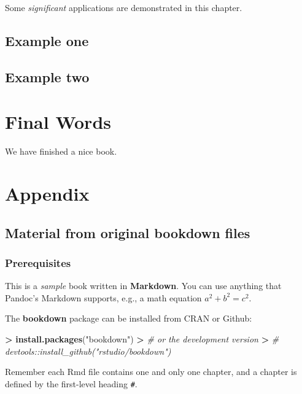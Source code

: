 \documentclass[]{book}
\newenvironment{Shaded}{\begin{snugshade}}{\end{snugshade}}
\newcommand{\KeywordTok}[1]{\textcolor[rgb]{0.13,0.29,0.53}{\textbf{#1}}}
\newcommand{\StringTok}[1]{\textcolor[rgb]{0.31,0.60,0.02}{#1}}
\newcommand{\CommentTok}[1]{\textcolor[rgb]{0.56,0.35,0.01}{\textit{#1}}}
\newcommand{\OperatorTok}[1]{\textcolor[rgb]{0.81,0.36,0.00}{\textbf{#1}}}
\newcommand{\ErrorTok}[1]{\textcolor[rgb]{0.64,0.00,0.00}{\textbf{#1}}}
\newcommand{\NormalTok}[1]{#1}
\theoremstyle{definition}
\theoremstyle{definition}
\theoremstyle{definition}
\theoremstyle{remark}
\begin{document}
Some \emph{significant} applications are demonstrated in this chapter.

\section{Example one}\label{example-one}

\section{Example two}\label{example-two}

\chapter{Final Words}\label{final-words}

We have finished a nice book.

\chapter{Appendix}\label{appendix}

\section{Material from original bookdown
files}\label{material-from-original-bookdown-files}

\subsection{Prerequisites}\label{prerequisites}

This is a \emph{sample} book written in \textbf{Markdown}. You can use
anything that Pandoc's Markdown supports, e.g., a math equation
\(a^2 + b^2 = c^2\).

The \textbf{bookdown} package can be installed from CRAN or Github:

\begin{Shaded}
\begin{Highlighting}[]
\OperatorTok{>}\StringTok{ }\KeywordTok{install.packages}\NormalTok{(}\StringTok{"bookdown"}\NormalTok{)}
\OperatorTok{>}\StringTok{ }\CommentTok{# or the development version}
\ErrorTok{>}\StringTok{ }\CommentTok{# devtools::install_github("rstudio/bookdown")}
\end{Highlighting}
\end{Shaded}

Remember each Rmd file contains one and only one chapter, and a chapter
is defined by the first-level heading \texttt{\#}.
\end{document}
